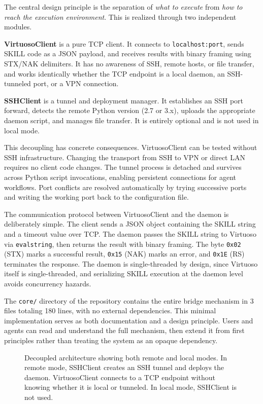 \documentclass[lettersize,journal]{ieee_template/IEEEtran}
\begin{document}
The central design principle is the separation of \emph{what to execute} from \emph{how to reach the execution environment}. This is realized through two independent modules.

\textbf{VirtuosoClient} is a pure TCP client. It connects to \texttt{localhost:port}, sends SKILL code as a JSON payload, and receives results with binary framing using STX/NAK delimiters. It has no awareness of SSH, remote hosts, or file transfer, and works identically whether the TCP endpoint is a local daemon, an SSH-tunneled port, or a VPN connection.

\textbf{SSHClient} is a tunnel and deployment manager. It establishes an SSH port forward, detects the remote Python version (2.7 or 3.x), uploads the appropriate daemon script, and manages file transfer. It is entirely optional and is not used in local mode.

This decoupling has concrete consequences. VirtuosoClient can be tested without SSH infrastructure. Changing the transport from SSH to VPN or direct LAN requires no client code changes. The tunnel process is detached and survives across Python script invocations, enabling persistent connections for agent workflows. Port conflicts are resolved automatically by trying successive ports and writing the working port back to the configuration file.

The communication protocol between VirtuosoClient and the daemon is deliberately simple. The client sends a JSON object containing the SKILL string and a timeout value over TCP. The daemon passes the SKILL string to Virtuoso via \texttt{evalstring}, then returns the result with binary framing. The byte \texttt{0x02} (STX) marks a successful result, \texttt{0x15} (NAK) marks an error, and \texttt{0x1E} (RS) terminates the response. The daemon is single-threaded by design, since Virtuoso itself is single-threaded, and serializing SKILL execution at the daemon level avoids concurrency hazards.

The \texttt{core/} directory of the repository contains the entire bridge mechanism in 3 files totaling 180 lines, with no external dependencies. This minimal implementation serves as both documentation and a design principle. Users and agents can read and understand the full mechanism, then extend it from first principles rather than treating the system as an opaque dependency.

\begin{figure}[!t]
\centering
\resizebox{0.85\textwidth}{!}{}
\caption{Decoupled architecture showing both remote and local modes. In remote mode, SSHClient creates an SSH tunnel and deploys the daemon. VirtuosoClient connects to a TCP endpoint without knowing whether it is local or tunneled. In local mode, SSHClient is not used.}
\label{fig:architecture}
\end{figure}
\end{document}

